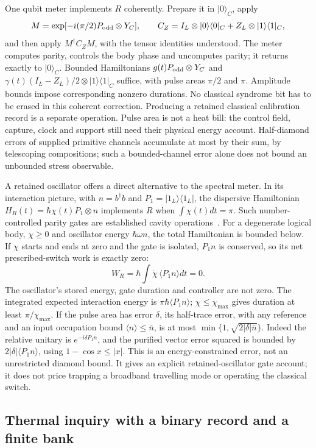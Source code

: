 \documentclass[aps,pre,onecolumn,superscriptaddress,floatfix,longbibliography]{revtex4-2}
\begin{document}
One qubit meter implements $R$ coherently. Prepare it in $|0\rangle_C$, apply
\[
 M=\exp[-i(\pi/2)P_{\rm odd}\otimes Y_C],
 \qquad C_Z=I_L\otimes|0\rangle\langle0|_C+
           Z_L\otimes|1\rangle\langle1|_C,
\]
and then apply $M^\dagger C_Z M$, with the tensor identities understood.
The meter computes parity, controls the body phase and uncomputes parity;
it returns exactly to $|0\rangle_C$. Bounded Hamiltonians
$g(t)P_{\rm odd}\otimes Y_C$ and
$\gamma(t)(I_L-Z_L)/2\otimes|1\rangle\langle1|_C$ suffice, with pulse areas
$\pi/2$ and $\pi$. Amplitude bounds impose corresponding nonzero durations.
No classical syndrome bit has to be erased in this coherent correction.
Producing a retained classical calibration record is a separate operation.
Pulse area is not a heat bill: the control field, capture, clock and support
still need their physical energy account. Half-diamond errors of supplied
primitive channels accumulate at most by their sum, by telescoping compositions;
such a bounded-channel error alone does not bound an unbounded stress observable.

A retained oscillator offers a direct alternative to the spectral meter.
In its interaction picture, with $n=b^\dagger b$ and
$P_1=|1_L\rangle\langle1_L|$, the dispersive Hamiltonian
$H_R(t)=\hbar\chi(t)P_1\otimes n$ implements $R$ when
$\int\chi(t)dt=\pi$. Such number-controlled parity gates are established
cavity operations~\cite[pp.~2--3]{Sun2013}. For a degenerate logical body,
$\chi\ge0$ and oscillator energy $\hbar\omega n$, the total Hamiltonian
is bounded below. If $\chi$ starts and ends at zero and the gate is isolated,
$P_1n$ is conserved, so its net prescribed-switch work is exactly zero:
\[
 W_R=\hbar\int\dot\chi\,\langle P_1n\rangle dt=0.
\]
The oscillator's stored energy, gate duration and controller are not zero.
The integrated expected interaction energy is
$\pi\hbar\langle P_1n\rangle$; $\chi\le\chi_{\max}$ gives duration
at least $\pi/\chi_{\max}$. If the pulse area has error $\delta$, its
half-trace error, with any reference and an input occupation bound
$\langle n\rangle\le\bar n$, is at most
$\min\{1,\sqrt{2|\delta|\bar n}\}$. Indeed the relative unitary is
$e^{-i\delta P_1n}$, and the purified vector error squared is bounded by
$2|\delta|\langle P_1n\rangle$, using $1-\cos x\le|x|$.
This is an energy-constrained error, not an unrestricted diamond bound.
It gives an explicit retained-oscillator gate account; it does not price
trapping a broadband travelling mode or operating the classical switch.

\subsection{Thermal inquiry with a binary record and a finite bank}
\label{sec:thermal-bank}
\end{document}
